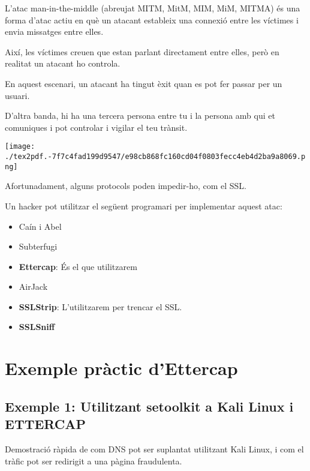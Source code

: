 \documentclass[]{article}
\begin{document}
L'atac man-in-the-middle (abreujat MITM, MitM, MIM, MiM, MITMA) és una
forma d'atac actiu en què un atacant estableix una connexió entre les
víctimes i envia missatges entre elles.

Així, les víctimes creuen que estan parlant directament entre elles,
però en realitat un atacant ho controla.

En aquest escenari, un atacant ha tingut èxit quan es pot fer passar per
un usuari.

D'altra banda, hi ha una tercera persona entre tu i la persona amb qui
et comuniques i pot controlar i vigilar el teu trànsit.

\texttt{[image: ./tex2pdf.-7f7c4fad199d9547/e98cb868fc160cd04f0803fecc4eb4d2ba9a8069.png]}

Afortunadament, alguns protocols poden impedir-ho, com el SSL.

Un hacker pot utilitzar el següent programari per implementar aquest
atac:

\begin{itemize}
\item
  Caín i Abel
\item
  Subterfugi
\item
  \textbf{Ettercap}: És el que utilitzarem
\item
  AirJack
\item
  \textbf{SSLStrip}: L'utilitzarem per trencar el SSL.
\item
  \textbf{SSLSniff}
\end{itemize}

\hypertarget{exemple-pruxe0ctic-dettercap}{%
\section{\texorpdfstring{\textbf{Exemple pràctic
d'Ettercap}}{Exemple pràctic d'Ettercap}}\label{exemple-pruxe0ctic-dettercap}}

\hypertarget{exemple-1-utilitzant-setoolkit-a-kali-linux-i-ettercap}{%
\subsection{\texorpdfstring{\textbf{Exemple 1: Utilitzant
\textbf{setoolkit} a Kali Linux i
ETTERCAP}}{Exemple 1: Utilitzant setoolkit a Kali Linux i ETTERCAP}}\label{exemple-1-utilitzant-setoolkit-a-kali-linux-i-ettercap}}

Demostració ràpida de com DNS pot ser suplantat utilitzant Kali Linux, i
com el tràfic pot ser redirigit a una pàgina fraudulenta.
\end{document}
